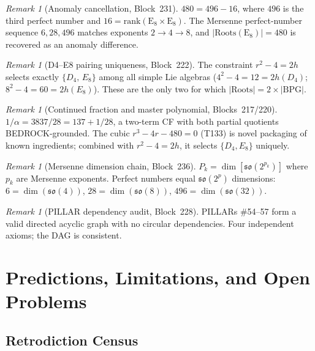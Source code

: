 \documentclass[aps,prd,twocolumn,superscriptaddress,floatfix,nofootinbib]{revtex4-2}
\theoremstyle{definition}
\theoremstyle{remark}
\newtheorem{remark}[theorem]{Remark}
\begin{document}
\begin{remark}[Anomaly cancellation, Block~231]
\label{rem:anomaly}
$480 = 496 - 16$, where $496$ is the third perfect number and
$16 = \mathrm{rank}(\mathrm{E}_8\times\mathrm{E}_8)$.  The Mersenne
perfect-number sequence $6,28,496$ matches exponents $2\to 4\to 8$,
and $|\mathrm{Roots}(\mathrm{E}_8)|=480$ is recovered as an anomaly difference.
\end{remark}

\begin{remark}[D4--E8 pairing uniqueness, Block~222]
\label{rem:d4e8}
The constraint $r^2-4=2h$ selects exactly $\{D_4,\,E_8\}$ among all simple
Lie algebras ($4^2{-}4=12=2h(D_4)$; $8^2{-}4=60=2h(E_8)$).  These are
the only two for which $|\mathrm{Roots}|=2\times|\mathrm{BPG}|$.
\end{remark}

\begin{remark}[Continued fraction and master polynomial, Blocks~217/220]
$1/\alpha = 3837/28 = 137 + 1/28$, a two-term CF with both partial quotients
BEDROCK-grounded.  The cubic $r^3-4r-480=0$ (T133) is novel packaging of known
ingredients; combined with $r^2-4=2h$, it selects $\{D_4,E_8\}$ uniquely.
\end{remark}

\begin{remark}[Mersenne dimension chain, Block~236]
\label{rem:mersenne}
$P_k = \dim[\mathfrak{so}(2^{p_k})]$ where $p_k$ are Mersenne exponents.
Perfect numbers equal $\mathfrak{so}(2^p)$ dimensions:
$6=\dim(\mathfrak{so}(4))$, $28=\dim(\mathfrak{so}(8))$,
$496=\dim(\mathfrak{so}(32))$.
\end{remark}

\begin{remark}[PILLAR dependency audit, Block~228]
PILLARs \#54--57 form a valid directed acyclic graph with no circular
dependencies.  Four independent axioms; the DAG is consistent.
\end{remark}

\section{Predictions, Limitations, and Open Problems}
\label{sec:predictions-limitations}

\subsection{Retrodiction Census}
\end{document}
